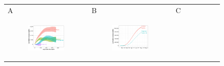 \documentclass[11pt]{article}
\begin{document}
\begin{figure}[ht]
	\begin{tabular}{lll}
	A&B&C\\
	\begin{subfigure}[t]{0.3\linewidth}
		\centering
		\includegraphics[width=1\linewidth]{figs/figure-2a.pdf} 
	\end{subfigure}&
	\begin{subfigure}[t]{0.3\linewidth}
		\centering
		\includegraphics[width=1\linewidth]{figs/figure-2b.pdf}
	\end{subfigure}&
	\begin{subfigure}[t]{0.3\linewidth}
		\centering

\end{subfigure}
\end{tabular}
\end{figure}
\end{document}
